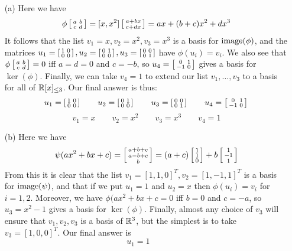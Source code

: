  \begin{itemize}
  \item[(a)] Here we have
   \[ \phi\left[\begin{smallmatrix} a&b\\ c&d\end{smallmatrix}\right] =
       [x,x^2]\left[\begin{smallmatrix} a+bx\\ c+dx\end{smallmatrix}\right] = ax+(b+c)x^2+dx^3
   \]
   It follows that the list $v_1=x,v_2=x^2,v_3=x^3$ is a
   basis for $\operatorname{image}(\phi)$, and the matrices
   $u_1=\left[\begin{smallmatrix} 1&0\\0&0\end{smallmatrix}\right],u_2=\left[\begin{smallmatrix} 0&1\\0&0\end{smallmatrix}\right],u_3=\left[\begin{smallmatrix} 0&0\\0&1\end{smallmatrix}\right]$
   have $\phi(u_i)=v_i$.  We also see that $\phi\left[\begin{smallmatrix} a&b\\ c&d\end{smallmatrix}\right]=0$
   iff $a=d=0$ and $c=-b$, so $u_4=\left[\begin{smallmatrix} 0&1\\-1&0\end{smallmatrix}\right]$ gives
   a basis for $\ker(\phi)$.  Finally, we can take $v_4=1$
   to extend our list $v_1,\dotsc,v_3$ to a basis for all of
   ${\mathbb{R}}[x]_{\leq 3}$.  Our final answer is thus:
   \[ u_1=\left[\begin{smallmatrix} 1&0\\0&0\end{smallmatrix}\right]\hspace{2em}
      u_2=\left[\begin{smallmatrix} 0&1\\0&0\end{smallmatrix}\right]\hspace{2em}
      u_3=\left[\begin{smallmatrix} 0&0\\0&1\end{smallmatrix}\right]\hspace{2em}
      u_4=\left[\begin{smallmatrix} 0&1\\-1&0\end{smallmatrix}\right]
   \]
   \[ v_1=x\hspace{2em}
      v_2=x^2\hspace{2em}
      v_3=x^3\hspace{2em}
      v_4=1
   \]
  \item[(b)] Here we have
   \[ \psi(ax^2+bx+c) =
       \left[\begin{smallmatrix} a+b+c \\ a-b+c\\ b \end{smallmatrix}\right] =
       (a+c)\left[\begin{smallmatrix} 1\\1\\0 \end{smallmatrix}\right] + b \left[\begin{smallmatrix} 1\\-1\\1\end{smallmatrix}\right]
   \]
   From this it is clear that the list
   $v_1=[1,1,0]^T,v_2=[1,-1,1]^T$ is a basis for
   $\operatorname{image}(\psi)$, and that if we put $u_1=1$ and $u_2=x$ then
   $\phi(u_i)=v_i$ for $i=1,2$.  Moreover, we have
   $\phi(ax^2+bx+c=0$ iff $b=0$ and $c=-a$, so $u_3=x^2-1$
   gives a basis for $\ker(\phi)$.  Finally, almost any
   choice of $v_3$ will ensure that $v_1,v_2,v_3$ is a basis
   of ${\mathbb{R}}^3$, but the simplest is to take $v_3=[1,0,0]^T$.
   Our final answer is
   \[ u_1 = 1\hspace{2em}
\]
\end{itemize}
